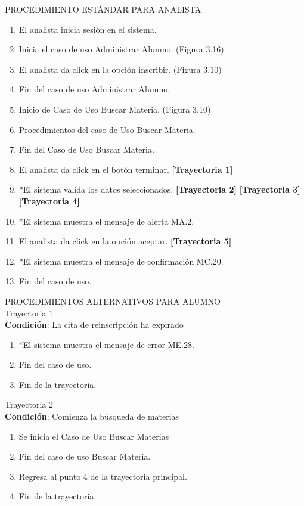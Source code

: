 \Large{PROCEDIMIENTO ESTÁNDAR PARA ANALISTA}
\large{}
\begin{enumerate}
    \item El analista inicia sesión en el sistema.
    \item Inicia el caso de uso Administrar Alumno. (Figura 3.16)
    \item El analista da click en la opción inscribir. (Figura 3.10)
    \item Fin del caso de uso Administrar Alumno.
    \item Inicio de Caso de Uso Buscar Materia. (Figura 3.10)
    \item Procedimientos del caso de Uso Buscar Materia.
    \item Fin del Caso de Uso Buscar Materia.
    \item El analista da click en el botón terminar. \textbf{[Trayectoria 1]}
    \item *El sistema valida los datos seleccionados. \textbf{[Trayectoria 2]} \textbf{[Trayectoria 3]} \textbf{[Trayectoria 4]}
    \item *El sistema muestra el mensaje de alerta MA.2.
    \item El analista da click en la opción aceptar. \textbf{[Trayectoria 5]}
    \item *El sistema muestra el mensaje de confirmación MC.20.
    \item Fin del caso de uso.
\end{enumerate}
\vspace*{1cm}
\Large{PROCEDIMIENTOS ALTERNATIVOS PARA ALUMNO}\\
\large{Trayectoria 1}\\
\textbf{Condición}: La cita de reinscripción ha expirado
\begin{enumerate}
    \item *El sistema muestra el mensaje de error ME.28.
    \item Fin del caso de uso.
    \item Fin de la trayectoria.
\end{enumerate}
\large{Trayectoria 2}\\
\textbf{Condición}: Comienza la búsqueda de materias
\begin{enumerate}
    \item Se inicia el Caso de Uso Buscar Materias
    \item Fin del caso de uso Buscar Materia.
    \item Regresa al punto 4 de la trayectoria principal.
    \item Fin de la trayectoria.
\end{enumerate}
